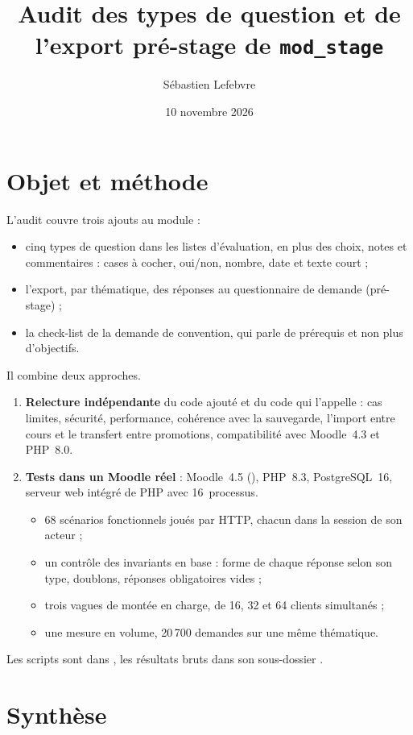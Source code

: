 \documentclass[11pt,a4paper]{article}
\title{Audit des types de question et de l'export pré-stage de \texttt{mod\_stage}}
\author{Sébastien Lefebvre}
\date{10 novembre 2026}
\begin{document}
\maketitle

\section{Objet et méthode}

L'audit couvre trois ajouts au module :
\begin{itemize}
  \item cinq types de question dans les listes d'évaluation, en plus des choix, notes et
    commentaires : cases à cocher, oui/non, nombre, date et texte court ;
  \item l'export, par thématique, des réponses au questionnaire de demande (pré-stage) ;
  \item la check-list de la demande de convention, qui parle de prérequis et non plus d'objectifs.
\end{itemize}

Il combine deux approches.
\begin{enumerate}
  \item \textbf{Relecture indépendante} du code ajouté et du code qui l'appelle : cas limites,
    sécurité, performance, cohérence avec la sauvegarde, l'import entre cours et le transfert entre
    promotions, compatibilité avec Moodle~4.3 et PHP~8.0.
  \item \textbf{Tests dans un Moodle réel} : Moodle~4.5 (), PHP~8.3,
    PostgreSQL~16, serveur web intégré de PHP avec 16~processus.
    \begin{itemize}
      \item 68 scénarios fonctionnels joués par HTTP, chacun dans la session de son acteur ;
      \item un contrôle des invariants en base : forme de chaque réponse selon son type, doublons,
        réponses obligatoires vides ;
      \item trois vagues de montée en charge, de 16, 32 et 64 clients simultanés ;
      \item une mesure en volume, 20\,700 demandes sur une même thématique.
    \end{itemize}
\end{enumerate}

Les scripts sont dans , les résultats bruts dans son sous-dossier
.

\section{Synthèse}
\end{document}
